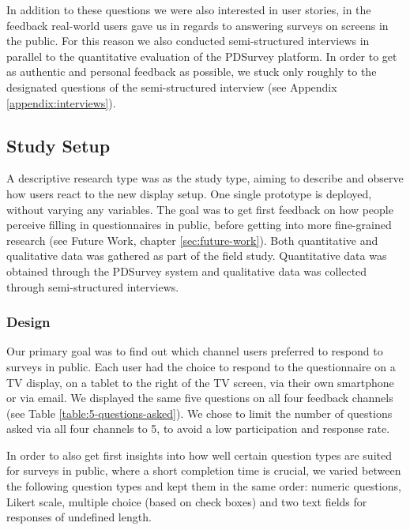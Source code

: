 	In addition to these questions we were also interested in user stories, in the feedback real-world users gave us in regards to answering surveys on screens in the public. For this reason we also conducted semi-structured interviews in parallel to the quantitative evaluation of the PDSurvey platform. In order to get as authentic and personal feedback as possible, we stuck only roughly to the designated questions of the semi-structured interview (see Appendix \ref{appendix:interviews}).




\subsection{Study Setup}

	A descriptive research type was as the study type, aiming to describe and observe how users react to the new display setup. One single prototype is deployed, without varying any variables. The goal was to get first feedback on how people perceive filling in questionnaires in public, before getting into more fine-grained research (see Future Work, chapter \ref{sec:future-work}). 
	Both quantitative and qualitative data was gathered as part of the field study. Quantitative data was obtained through the PDSurvey system and qualitative data was collected through semi-structured interviews.



	\subsubsection{Design}
	\label{sec:field-study:design}


	Our primary goal was to find out which channel users preferred to respond to surveys in public. Each user had the choice to respond to the questionnaire on a TV display, on a tablet to the right of the TV screen, via their own smartphone or via email. We displayed the same five questions on all four feedback channels (see Table \ref{table:5-questions-asked}). We chose to limit the number of questions asked via all four channels to 5, to avoid a low participation and response rate. 

	


	In order to also get first insights into how well certain question types are suited for surveys in public, where a short completion time is crucial, we varied between the following question types and kept them in the same order: numeric questions, Likert scale, multiple choice (based on check boxes) and two text fields for responses of undefined length. 

